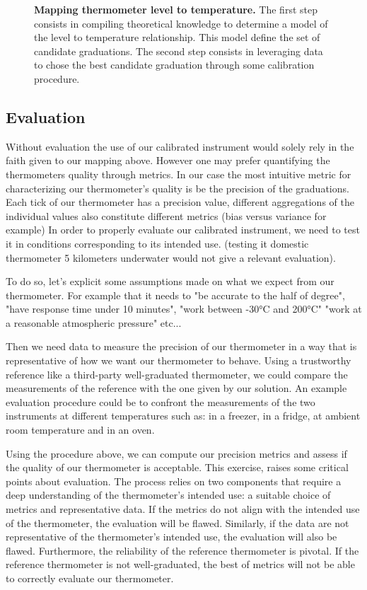 \begin{bibunit}
\begin{figure}[h]
    \caption{\textbf{Mapping thermometer level to temperature.} The first step consists in compiling theoretical knowledge to determine a model of the level to temperature relationship. This model define the set of candidate graduations. The second step consists in leveraging data to chose the best candidate graduation through some calibration procedure.}
    \label{fig:therm_mapping}
\end{figure}

\subsection*{Evaluation}

Without evaluation the use of our calibrated instrument would solely rely in the faith given to our mapping above.
However one may prefer quantifying the thermometers quality through metrics.
In our case the most intuitive metric for characterizing our thermometer's quality is be the precision of the graduations.
Each tick of our thermometer has a precision value, different aggregations of the individual values also constitute different metrics (bias versus variance for example)
In order to properly evaluate our calibrated instrument, we need to test it in conditions corresponding to its intended use. (testing it domestic thermometer 5 kilometers underwater would not give a relevant evaluation).

 To do so, let's explicit some assumptions made on what we expect from our thermometer.
  For example that it needs to "be accurate to the half of degree", "have response time under 10 minutes", "work between -30°C and 200°C" "work at a reasonable atmospheric pressure" etc...

Then we need data to measure the precision of our thermometer in a way that is representative of how we want our thermometer to behave. Using a trustworthy reference like a third-party well-graduated thermometer, we could compare the measurements of the reference with the one given by our solution.
  An example evaluation procedure could be to confront the measurements of the two instruments at different temperatures such as: in a freezer, in a fridge, at ambient room temperature and in an oven.

Using the procedure above, we can compute our precision metrics and assess if the quality of our thermometer is acceptable.
This exercise, raises some critical points about evaluation. The process relies on two components that require a deep understanding of the thermometer's intended use: a suitable choice of metrics and representative data.
If the metrics do not align with the intended use of the thermometer, the evaluation will be flawed. Similarly, if the data are not representative of the thermometer's intended use, the evaluation will also be flawed.
 Furthermore, the reliability of the reference thermometer is pivotal. If the reference thermometer is not well-graduated, the best of metrics will not be able to correctly evaluate our thermometer. 


\end{bibunit}
